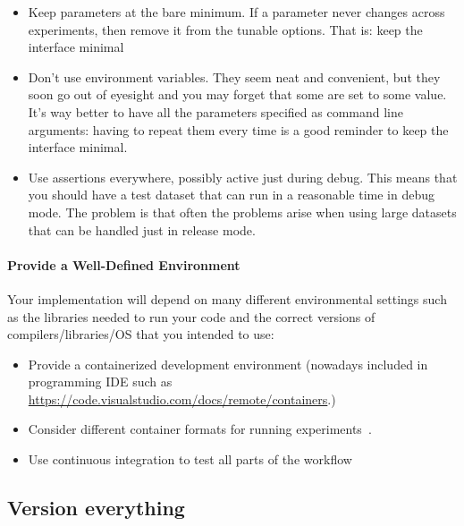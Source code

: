 \documentclass{llncs}
\begin{document}
\begin{itemize}
\item Keep parameters at the bare minimum. If a parameter never changes across
  experiments, then remove it from the tunable options. That is: keep the
  interface minimal
\item Don't use environment variables. They seem neat and convenient, but they soon
  go out of eyesight and you may forget that some are set to some value. It's
  way better to have all the parameters specified as command line arguments:
  having to repeat them every time is a good reminder to keep the interface
  minimal.
\item Use assertions everywhere, possibly active just during debug. This means that
  you should have a test dataset that can run in a reasonable time in debug
  mode. The problem is that often the problems arise when using large datasets
  that can be handled just in release mode.
\end{itemize}

\paragraph{Provide a Well-Defined Environment}

Your implementation will depend on many different environmental settings such as the libraries needed to run your code and the correct versions of compilers/libraries/OS that you intended to use:
\begin{itemize}
  \item Provide a containerized development environment (nowadays included in programming IDE such as \url{https://code.visualstudio.com/docs/remote/containers}.)
  \item Consider different container formats for running experiments~\cite{arango2017performance}.
  \item Use continuous integration to test all parts of the workflow
\end{itemize}

\subsection{Version everything}
\end{document}
